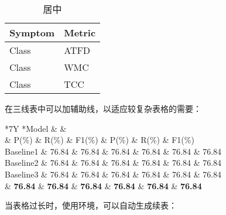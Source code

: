 \begin{texcode}[]{}
  \begin{table}[H]
    \caption{居中}
    \begin{tabularx}{\textwidth}{YY}
    \toprule
        \textbf{Symptom} & \textbf{Metric} \\
    \midrule
        Class  & ATFD \\
        Class  & WMC \\
        Class  & TCC \\
    \bottomrule
    \end{tabularx}
  \end{table}
\end{texcode}


\clearpage


在三线表中可以加辅助线，以适应较复杂表格的需要：

\begin{texcode}[]{}
\begin{table}[H]  
  \centering
  \caption{compare with other approachs}
  \label{tab:methodcompare}
  \begin{tabularx}{\textwidth}{*{7}Y}
    \toprule
    *{Model} &  &   \\ 
    & P(\%) & R(\%) & F1(\%) & P(\%) & R(\%) & F1(\%) \\
    \midrule 
    Baseline1 & 76.84 & 76.84 & 76.84 & 76.84 & 76.84 & 76.84 \\
    \midrule[0.5pt]
    Baseline2  & 76.84 & 76.84 & 76.84 & 76.84 & 76.84 & 76.84 \\
    Baseline3  & 76.84 & 76.84 & 76.84 & 76.84 & 76.84 & 76.84 \\
      & {\bf 76.84} & {\bf 76.84} & {\bf 76.84} & {\bf 76.84} & {\bf 76.84} & {\bf 76.84} \\
    \bottomrule
  \end{tabularx}
\end{table}
\end{texcode}

\clearpage


当表格过长时，使用环境，可以自动生成续表：

